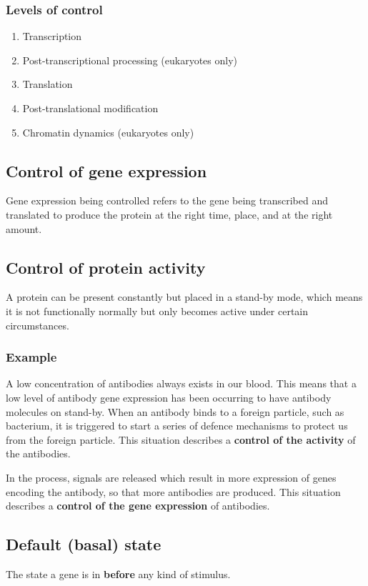 \documentclass[11pt]{article}
\begin{document}
\subsubsection{Levels of control}
\label{sec:org406ad2a}
\begin{enumerate}
\item Transcription
\item Post-transcriptional processing (eukaryotes only)
\item Translation
\item Post-translational modification
\item Chromatin dynamics (eukaryotes only)
\end{enumerate}


\subsection{Control of gene expression}
\label{sec:org54c4ecd}
Gene expression being controlled refers to the gene being transcribed and translated to produce the protein at the right time, place, and at the right amount.

\newpage

\subsection{Control of protein activity}
\label{sec:org1c2b3f2}
A protein can be present constantly but placed in a stand-by mode, which means it is not functionally normally but only becomes active under certain circumstances.

\subsubsection{Example}
\label{sec:orgf7f3a4e}
A low concentration of antibodies always exists in our blood. This means that a low level of antibody gene expression has been occurring to have antibody molecules on stand-by. When an antibody binds to a foreign particle, such as bacterium, it is triggered to start a series of defence mechanisms to protect us from the foreign particle. This situation describes a \textbf{control of the activity} of the antibodies.

In the process, signals are released which result in more expression of genes encoding the antibody, so that more antibodies are produced. This situation describes a \textbf{control of the gene expression} of antibodies.

\subsection{Default (basal) state}
\label{sec:orgdb6dc57}
The state a gene is in \textbf{before} any kind of stimulus.
\end{document}
